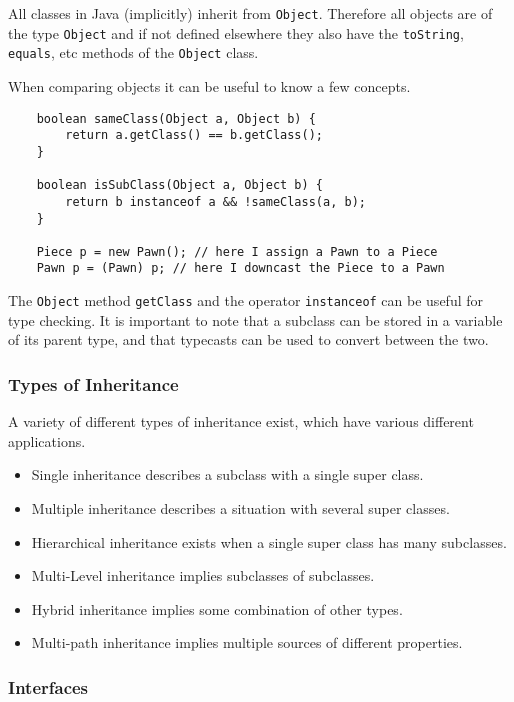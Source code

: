 \documentclass[12pt]{report}
\newcommand{\code}[1]{\lstinline{#1}}
\begin{document}
\begin{flushleft}
All classes in Java (implicitly) inherit from \code{Object}. Therefore all
objects are of the type \code{Object} and if not defined elsewhere they also
have the \code{toString}, \code{equals}, etc methods of the \code{Object}
class. \par
When comparing objects it can be useful to know a few concepts.

\begin{lstlisting}
    boolean sameClass(Object a, Object b) {
        return a.getClass() == b.getClass();
    }

    boolean isSubClass(Object a, Object b) {
        return b instanceof a && !sameClass(a, b);
    }

    Piece p = new Pawn(); // here I assign a Pawn to a Piece
    Pawn p = (Pawn) p; // here I downcast the Piece to a Pawn
\end{lstlisting}

The \code{Object} method \code{getClass} and the operator \code{instanceof} can
be useful for type checking. It is important to note that a subclass can be
stored in a variable of its parent type, and that typecasts can be used to
convert between the two.

\subsubsection*{Types of Inheritance}

A variety of different types of inheritance exist, which have various different
applications.

\begin{itemize}
    \item Single inheritance describes a subclass with a single super class.
    \item Multiple inheritance describes a situation with several super
        classes.
    \item Hierarchical inheritance exists when a single super class has many
        subclasses.
    \item Multi-Level inheritance implies subclasses of subclasses.
    \item Hybrid inheritance implies some combination of other types.
    \item Multi-path inheritance implies multiple sources of different
        properties.
\end{itemize}

\subsubsection*{Interfaces}


\end{flushleft}
\end{document}
